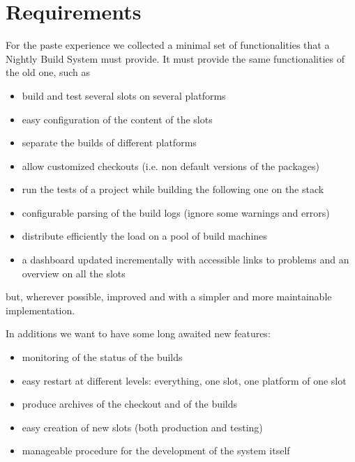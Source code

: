 \section{Requirements}
\label{sec:Requirements}
For the paste experience we collected a minimal set of functionalities that a
Nightly Build System must provide. It must provide the same functionalities of the old one, such as
\begin{itemize}
  \item build and test several slots on several platforms
  \item easy configuration of the content of the slots
  \item separate the builds of different platforms
  \item allow customized checkouts (i.e. non default versions of the packages)
  \item run the tests of a project while building the following one on the stack
  \item configurable parsing of the build logs (ignore some warnings and errors)
  \item distribute efficiently the load on a pool of build machines
  \item a dashboard updated incrementally with accessible links to problems and
an overview on all the slots
\end{itemize}
but, wherever possible, improved and with a simpler and more maintainable
implementation.

In additions we want to have some long awaited new features:
\begin{itemize}
  \item monitoring of the status of the builds
  \item easy restart at different levels: everything, one slot, one platform of
one slot
  \item produce archives of the checkout and of the builds
  \item easy creation of new slots (both production and testing)
  \item manageable procedure for the development of the system itself
\end{itemize}
